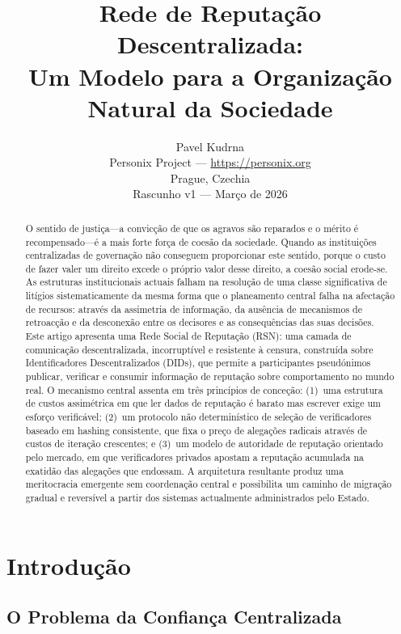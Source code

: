 \documentclass[11pt,a4paper,twocolumn]{article}
\title{\textbf{Rede de Reputação Descentralizada:\\Um Modelo para a Organização Natural da Sociedade}}
\author{Pavel Kudrna\\Personix Project --- \url{https://personix.org}\\Prague, Czechia\\Rascunho v1 --- Março de 2026}
\date{}
\begin{document}
\maketitle

\begin{abstract}
O sentido de justiça---a convicção de que os agravos são reparados e o mérito é recompensado---é a mais forte força de coesão da sociedade. Quando as instituições centralizadas de governação não conseguem proporcionar este sentido, porque o custo de fazer valer um direito excede o próprio valor desse direito, a coesão social erode-se. As estruturas institucionais actuais falham na resolução de uma classe significativa de litígios sistematicamente da mesma forma que o planeamento central falha na afectação de recursos: através da assimetria de informação, da ausência de mecanismos de retroacção e da desconexão entre os decisores e as consequências das suas decisões. Este artigo apresenta uma Rede Social de Reputação (RSN): uma camada de comunicação descentralizada, incorruptível e resistente à censura, construída sobre Identificadores Descentralizados (DIDs), que permite a participantes pseudónimos publicar, verificar e consumir informação de reputação sobre comportamento no mundo real. O mecanismo central assenta em três princípios de conceção: (1)~uma estrutura de custos assimétrica em que ler dados de reputação é barato mas escrever exige um esforço verificável; (2)~um protocolo não determinístico de seleção de verificadores baseado em hashing consistente, que fixa o preço de alegações radicais através de custos de iteração crescentes; e (3)~um modelo de autoridade de reputação orientado pelo mercado, em que verificadores privados apostam a reputação acumulada na exatidão das alegações que endossam. A arquitetura resultante produz uma meritocracia emergente sem coordenação central e possibilita um caminho de migração gradual e reversível a partir dos sistemas actualmente administrados pelo Estado.
\end{abstract}

\section{Introdução}

\subsection{O Problema da Confiança Centralizada}
\end{document}
